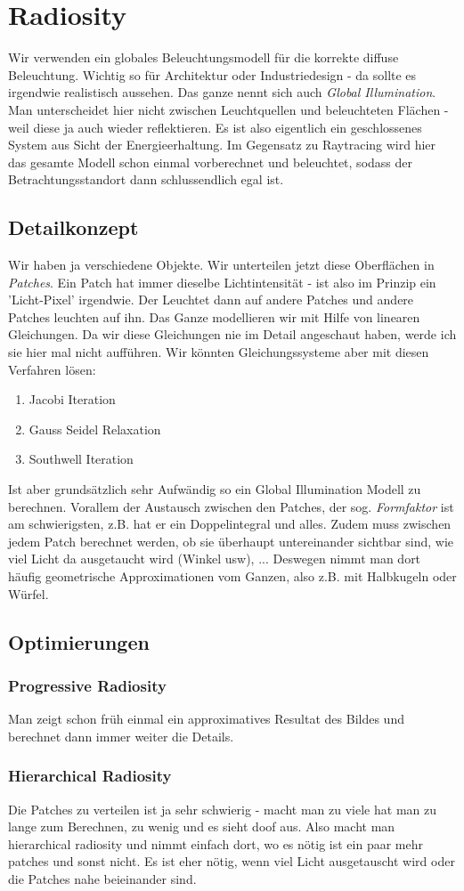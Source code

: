 \chapter{Radiosity}
Wir verwenden ein globales Beleuchtungsmodell für die korrekte diffuse Beleuchtung. Wichtig so für Architektur oder Industriedesign - da sollte es irgendwie realistisch aussehen. Das ganze nennt sich auch \textit{Global Illumination}. Man unterscheidet hier nicht zwischen Leuchtquellen und beleuchteten Flächen - weil diese ja auch wieder reflektieren. Es ist also eigentlich ein geschlossenes System aus Sicht der Energieerhaltung. Im Gegensatz zu Raytracing wird hier das gesamte Modell schon einmal vorberechnet und beleuchtet, sodass der Betrachtungsstandort dann schlussendlich egal ist.
\section{Detailkonzept}
Wir haben ja verschiedene Objekte. Wir unterteilen jetzt diese Oberflächen in \textit{Patches}. Ein Patch hat immer dieselbe Lichtintensität - ist also im Prinzip ein 'Licht-Pixel' irgendwie. Der Leuchtet dann auf andere Patches und andere Patches leuchten auf ihn. Das Ganze modellieren wir mit Hilfe von linearen Gleichungen. Da wir diese Gleichungen nie im Detail angeschaut haben, werde ich sie hier mal nicht aufführen. Wir könnten Gleichungssysteme aber mit diesen Verfahren lösen:
\begin{enumerate}
	\item Jacobi Iteration
	\item Gauss Seidel Relaxation
	\item Southwell Iteration
\end{enumerate}
Ist aber grundsätzlich sehr Aufwändig so ein Global Illumination Modell zu berechnen. Vorallem der Austausch zwischen den Patches, der sog. \textit{Formfaktor} ist am schwierigsten, z.B. hat er ein Doppelintegral und alles. Zudem muss zwischen jedem Patch berechnet werden, ob sie überhaupt untereinander sichtbar sind, wie viel Licht da ausgetaucht wird (Winkel usw), ... Deswegen nimmt man dort häufig geometrische Approximationen vom Ganzen, also z.B. mit Halbkugeln oder Würfel.

\section{Optimierungen}	
\subsection{Progressive Radiosity}
Man zeigt schon früh einmal ein approximatives Resultat des Bildes und berechnet dann immer weiter die Details.
\subsection{Hierarchical Radiosity}
Die Patches zu verteilen ist ja sehr schwierig - macht man zu viele hat man zu lange zum Berechnen, zu wenig und es sieht doof aus. Also macht man hierarchical radiosity und nimmt einfach dort, wo es nötig ist ein paar mehr patches und sonst nicht. Es ist eher nötig, wenn viel Licht ausgetauscht wird oder die Patches nahe beieinander sind.